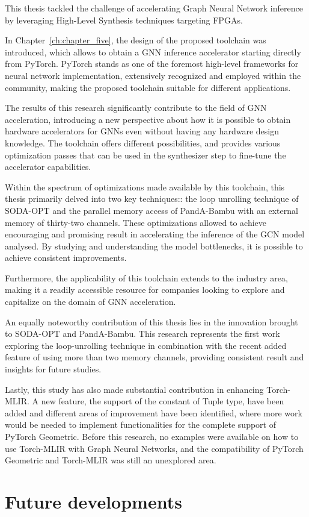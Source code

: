 This thesis tackled the challenge of accelerating Graph Neural Network inference by leveraging High-Level Synthesis techniques targeting FPGAs.

In Chapter~\ref{ch:chapter_five}, the design of the proposed toolchain was introduced, which allows to obtain a GNN inference accelerator starting directly from PyTorch.
PyTorch stands as one of the foremost high-level frameworks for neural network implementation, extensively recognized and employed within the community, making the proposed toolchain suitable for different applications.

The results of this research significantly contribute to the field of GNN acceleration, introducing a new perspective about how it is possible to obtain hardware accelerators for GNNs even without having any hardware design knowledge.
The toolchain offers different possibilities, and provides various optimization passes that can be used in the synthesizer step to fine-tune the accelerator capabilities.

Within the spectrum of optimizations made available by this toolchain, this thesis primarily delved into two key techniques:: the loop unrolling technique of SODA-OPT and the parallel memory access of PandA-Bambu with an external memory of thirty-two channels.
These optimizations allowed to achieve encouraging and promising result in accelerating the inference of the GCN model analysed.
By studying and understanding the model bottlenecks, it is possible to achieve consistent improvements.

Furthermore, the applicability of this toolchain extends to the industry area, making it a readily accessible resource for companies looking to explore and capitalize on the domain of GNN acceleration.

An equally noteworthy contribution of this thesis lies in the innovation brought to SODA-OPT and PandA-Bambu.
This research represents the first work exploring the loop-unrolling technique in combination with the recent added feature of using more than two memory channels, providing consistent result and insights for future studies.

Lastly, this study has also made substantial contribution in enhancing Torch-MLIR.
A new feature, the support of the constant of Tuple type, have been added and different areas of improvement have been identified, where more work would be needed to implement functionalities for the complete support of PyTorch Geometric.
Before this research, no examples were available on how to use Torch-MLIR with Graph Neural Networks, and the compatibility of PyTorch Geometric and Torch-MLIR was still an unexplored area.

\section{Future developments}
\label{sec:future-dev}%

